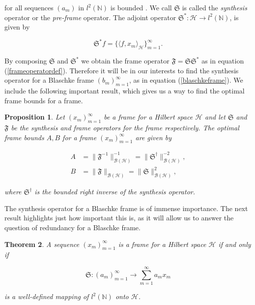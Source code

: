 \documentclass[10pt, reqno]{amsart}
\newtheorem{theorem}{Theorem}[section]
\newtheorem{proposition}[theorem]{Proposition}
\theoremstyle{definition}
\numberwithin{equation}{section}
\begin{document}
\noindent for all sequences $(a_{m})$ in $l^{2}(\mathbb{N})$ is bounded \cite[Theorem 3.2.3]{Christensen}. We call $\mathfrak{S}$ is called the {\it{synthesis}} operator or the {\it{pre-frame}} operator. The adjoint operator $\mathfrak{S}^{*}:\mathcal{H}\rightarrow l^{2}(\mathbb{N})$, is given by

$$\mathfrak{S}^{*}f=\{\langle f,x_{m}\rangle_{\mathcal{H}}\}_{m=1}^{\infty}.$$

\noindent By composing $\mathfrak{S}$ and $\mathfrak{S}^{*}$ we obtain the frame operator $\mathfrak{F}=\mathfrak{S}\mathfrak{S}^{*}$ as in equation (\ref{frameoperatordef}). Therefore it will be in our interests to find the synthesis operator for a Blaschke frame $(b_{m})_{m=1}^{\infty}$, as in equation (\ref{blaschkeframe}). We include the following important result, which gives us a way to find the optimal frame bounds for a frame.

\begin{proposition}{}\label{optimalframebounds}
    Let $(x_{m})_{m=1}^{\infty}$ be a frame for a Hilbert space $\mathcal{H}$ and let $\mathfrak{S}$ and $\mathfrak{F}$ be the synthesis and frame operators for the frame respectively. The optimal frame bounds $A,B$ for a frame $(x_{m})_{m=1}^{\infty}$ are given by 

\begin{align*}
    A&=\|\mathfrak{F}^{-1}\|^{-1}_{\mathcal{B}(\mathcal{H})} = \|\mathfrak{S}^{\dagger}\|^{-2}_{\mathcal{B}(\mathcal{H})},\\
    B&=\|\mathfrak{F}\|_{\mathcal{B}(\mathcal{H})} = \|\mathfrak{S}\|^{2}_{\mathcal{B}(\mathcal{H})},
\end{align*}

\noindent where $\mathfrak{S}^{\dagger}$ is the bounded right inverse of the synthesis operator.
    
\end{proposition}

The synthesis operator for a Blaschke frame is of immense importance. The next result highlights just how important this is, as it will allow us to answer the question of redundancy for a Blaschke frame.

\begin{theorem}{}\label{existencepreframe}
    A sequence $(x_{m})_{m=1}^{\infty}$ is a frame for a Hilbert space $\mathcal{H}$ if and only if 

$$\mathfrak{S}:(a_{m})_{m=1}^{\infty}\rightarrow \sum_{m=1}^{\infty}a_{m}x_{m}$$

\noindent is a well-defined mapping of $l^{2}(\mathbb{N})$ onto $\mathcal{H}$.
    
\end{theorem}
\end{document}
